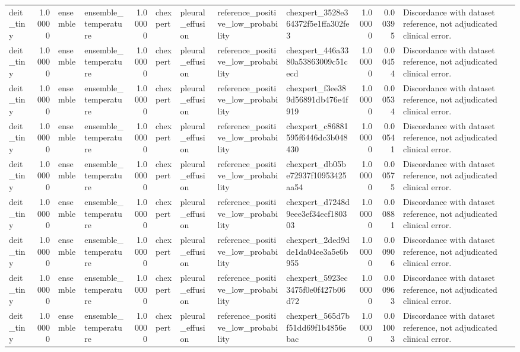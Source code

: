 \begin{tabular}{lrllrllllrrl}
deit\_tiny & 1.00000 & ensemble & ensemble\_temperature & 1.00000 & chexpert & pleural\_effusion & reference\_positive\_low\_probability & chexpert\_3528e364372f5e1ffa302fe3 & 1.00000 & 0.00395 & Discordance with dataset reference, not adjudicated clinical error. \\
deit\_tiny & 1.00000 & ensemble & ensemble\_temperature & 1.00000 & chexpert & pleural\_effusion & reference\_positive\_low\_probability & chexpert\_446a3380a53863009c51cecd & 1.00000 & 0.00454 & Discordance with dataset reference, not adjudicated clinical error. \\
deit\_tiny & 1.00000 & ensemble & ensemble\_temperature & 1.00000 & chexpert & pleural\_effusion & reference\_positive\_low\_probability & chexpert\_f3ee389d56891db476e4f919 & 1.00000 & 0.00534 & Discordance with dataset reference, not adjudicated clinical error. \\
deit\_tiny & 1.00000 & ensemble & ensemble\_temperature & 1.00000 & chexpert & pleural\_effusion & reference\_positive\_low\_probability & chexpert\_c86881595f6446dc3b048430 & 1.00000 & 0.00541 & Discordance with dataset reference, not adjudicated clinical error. \\
deit\_tiny & 1.00000 & ensemble & ensemble\_temperature & 1.00000 & chexpert & pleural\_effusion & reference\_positive\_low\_probability & chexpert\_db05be72937f10953425aa54 & 1.00000 & 0.00575 & Discordance with dataset reference, not adjudicated clinical error. \\
deit\_tiny & 1.00000 & ensemble & ensemble\_temperature & 1.00000 & chexpert & pleural\_effusion & reference\_positive\_low\_probability & chexpert\_d7248d9eee3ef34ecf180303 & 1.00000 & 0.00881 & Discordance with dataset reference, not adjudicated clinical error. \\
deit\_tiny & 1.00000 & ensemble & ensemble\_temperature & 1.00000 & chexpert & pleural\_effusion & reference\_positive\_low\_probability & chexpert\_2ded9dde1da04ee3a5e6b955 & 1.00000 & 0.00906 & Discordance with dataset reference, not adjudicated clinical error. \\
deit\_tiny & 1.00000 & ensemble & ensemble\_temperature & 1.00000 & chexpert & pleural\_effusion & reference\_positive\_low\_probability & chexpert\_5923ec3475f0e0f427b06d72 & 1.00000 & 0.00963 & Discordance with dataset reference, not adjudicated clinical error. \\
deit\_tiny & 1.00000 & ensemble & ensemble\_temperature & 1.00000 & chexpert & pleural\_effusion & reference\_positive\_low\_probability & chexpert\_565d7bf51dd69f1b4856ebac & 1.00000 & 0.01003 & Discordance with dataset reference, not adjudicated clinical error. \\

\end{tabular}
